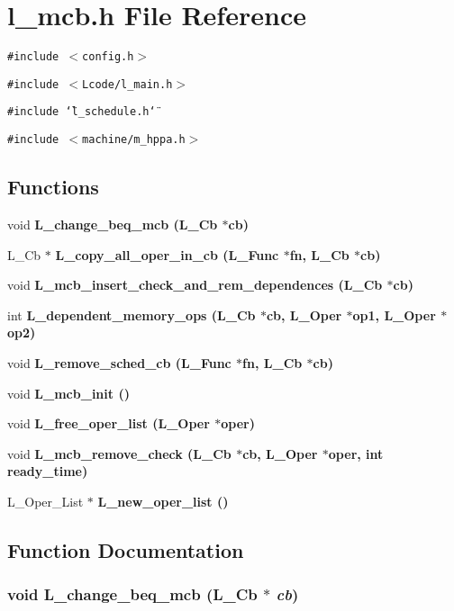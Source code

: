 \section{l\_\-mcb.h File Reference}
\label{l__mcb_8h}
{\tt \#include $<$config.h$>$}\par
{\tt \#include $<$Lcode/l\_\-main.h$>$}\par
{\tt \#include \char`\"{}l\_\-schedule.h\char`\"{}}\par
{\tt \#include $<$machine/m\_\-hppa.h$>$}\par
\subsection*{Functions}
\begin{CompactItemize}
\item 
void \bf{L\_\-change\_\-beq\_\-mcb} (L\_\-Cb $\ast$cb)
\item 
L\_\-Cb $\ast$ \bf{L\_\-copy\_\-all\_\-oper\_\-in\_\-cb} (L\_\-Func $\ast$fn, L\_\-Cb $\ast$cb)
\item 
void \bf{L\_\-mcb\_\-insert\_\-check\_\-and\_\-rem\_\-dependences} (L\_\-Cb $\ast$cb)
\item 
int \bf{L\_\-dependent\_\-memory\_\-ops} (L\_\-Cb $\ast$cb, L\_\-Oper $\ast$op1, L\_\-Oper $\ast$op2)
\item 
void \bf{L\_\-remove\_\-sched\_\-cb} (L\_\-Func $\ast$fn, L\_\-Cb $\ast$cb)
\item 
void \bf{L\_\-mcb\_\-init} ()
\item 
void \bf{L\_\-free\_\-oper\_\-list} (L\_\-Oper $\ast$oper)
\item 
void \bf{L\_\-mcb\_\-remove\_\-check} (L\_\-Cb $\ast$cb, L\_\-Oper $\ast$oper, int ready\_\-time)
\item 
L\_\-Oper\_\-List $\ast$ \bf{L\_\-new\_\-oper\_\-list} ()
\end{CompactItemize}


\subsection{Function Documentation}
\subsubsection{\setlength{\rightskip}{0pt plus 5cm}void L\_\-change\_\-beq\_\-mcb (L\_\-Cb $\ast$ {\em cb})}\label{l__mcb_8h_a9aa874499a28b5d29c17cdd1084e064}




